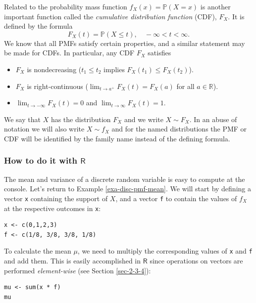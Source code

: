 \documentclass[captions=tableheading]{scrbook}
\begin{document}
Related to the probability mass function \(f_{X}(x)=\mathbb{P}(X=x)\) is another important function called the \emph{cumulative distribution function} (CDF), \(F_{X}\). It is defined by the formula
\begin{equation}
F_{X}(t)=\mathbb{P}(X\leq t),\quad -\infty < t < \infty.
\end{equation}
We know that all PMFs satisfy certain properties, and a similar statement may be made for CDFs. In particular, any CDF \(F_{X}\) satisfies
\begin{itemize}
\item \(F_{X}\) is nondecreasing (\(t_{1}\leq t_{2}\) implies \(F_{X}(t_{1})\leq F_{X}(t_{2})\)).
\item \(F_{X}\) is right-continuous (\(\lim_{t\to a^{+}}F_{X}(t)=F_{X}(a)\) for all \(a\in\mathbb{R}\)).
\item \(\lim_{t\to-\infty}F_{X}(t)=0\) and \(\lim_{t\to\infty}F_{X}(t)=1\).
\end{itemize}
We say that \(X\) has the distribution \(F_{X}\) and we write \(X\sim F_{X}\). In an abuse of notation we will also write \(X\sim f_{X}\) and for the named distributions the PMF or CDF will be identified by the family name instead of the defining formula.
\subsubsection{How to do it with \(\mathsf{R}\)}
\label{sec-5-1-2-1}
\label{sub-disc-rv-how-r}


The mean and variance of a discrete random variable is easy to compute at the console. Let's return to Example \ref{exa-disc-pmf-mean}. We will start by defining a vector \texttt{x} containing the support of \(X\), and a vector \texttt{f} to contain the values of \(f_{X}\) at the respective outcomes in \texttt{x}:


\lstset{language=R}
\begin{lstlisting}
x <- c(0,1,2,3)
f <- c(1/8, 3/8, 3/8, 1/8)
\end{lstlisting}

To calculate the mean \(\mu\), we need to multiply the corresponding values of \texttt{x} and \texttt{f} and add them. This is easily accomplished in \(\mathsf{R}\) since operations on vectors are performed \emph{element-wise} (see Section \ref{sec-2-3-4}): 


\lstset{language=R}
\begin{lstlisting}
mu <- sum(x * f)
mu
\end{lstlisting}
\end{document}
